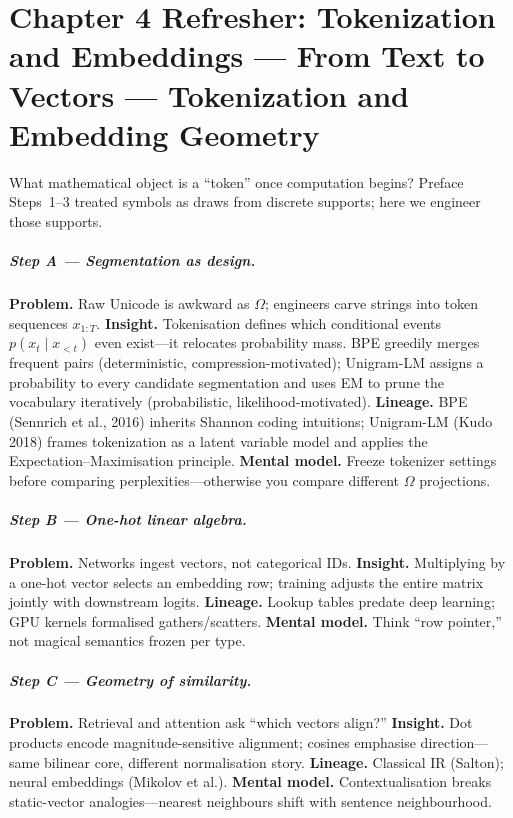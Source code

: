 \chapter{Chapter 4 Refresher: Tokenization and Embeddings — From Text to Vectors --- Tokenization and Embedding Geometry}
\label{chap:tokenization}

\scenelabel
What mathematical object is a ``token'' once computation begins? Preface Steps~1--3 treated symbols as draws from discrete supports; here we engineer those supports.

\paragraph{Step A --- Segmentation as design.}
\textbf{Problem.} Raw Unicode is awkward as \(\Omega\); engineers carve strings into token sequences \(x_{1:T}\).
\textbf{Insight.} Tokenisation defines which conditional events \(p(x_t\mid x_{<t})\) even exist---it relocates probability mass.
BPE greedily merges frequent pairs (deterministic, compression-motivated); Unigram-LM assigns a probability to every candidate segmentation and uses EM to prune the vocabulary iteratively (probabilistic, likelihood-motivated).
\textbf{Lineage.} BPE (Sennrich et al., 2016) inherits Shannon coding intuitions; Unigram-LM (Kudo 2018) frames tokenization as a latent variable model and applies the Expectation--Maximisation principle.
\textbf{Mental model.} Freeze tokenizer settings before comparing perplexities---otherwise you compare different \(\Omega\) projections.

\paragraph{Step B --- One-hot linear algebra.}
\textbf{Problem.} Networks ingest vectors, not categorical IDs.
\textbf{Insight.} Multiplying by a one-hot vector selects an embedding row; training adjusts the entire matrix jointly with downstream logits.
\textbf{Lineage.} Lookup tables predate deep learning; GPU kernels formalised gathers/scatters.
\textbf{Mental model.} Think ``row pointer,'' not magical semantics frozen per type.

\paragraph{Step C --- Geometry of similarity.}
\textbf{Problem.} Retrieval and attention ask ``which vectors align?''
\textbf{Insight.} Dot products encode magnitude-sensitive alignment; cosines emphasise direction---same bilinear core, different normalisation story.
\textbf{Lineage.} Classical IR (Salton); neural embeddings (Mikolov et al.).
\textbf{Mental model.} Contextualisation breaks static-vector analogies---nearest neighbours shift with sentence neighbourhood.

